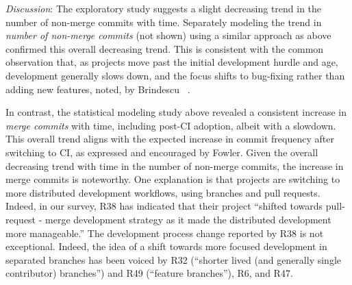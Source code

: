 %

%

\smallskip\noindent \emph{Discussion}:
The exploratory study suggests a slight decreasing trend in the number 
of non-merge commits with time.
Separately modeling the trend in \emph{number of non-merge commits}
(not shown) using a similar approach as above confirmed this overall 
decreasing trend.
This is consistent with the common observation that, as projects move 
past the initial development hurdle and age, development generally slows 
down, and the focus shifts to bug-fixing rather than adding new features, 
noted, \eg by Brindescu \etal~\cite{brindescu2014centralized}.

In contrast, the statistical modeling study above revealed a consistent 
increase in \emph{merge commits} with time, including post-CI adoption, 
albeit with a slowdown.
This overall trend aligns with the expected increase in commit frequency 
after switching to CI, as expressed and encouraged by Fowler.
Given the overall decreasing trend with time in the number of non-merge
commits, the increase in merge commits is noteworthy.
One explanation is that projects are switching to more distributed
development workflows, using branches and pull requests. 
Indeed, in our survey, R38 has indicated that their project ``shifted towards 
pull-request - merge development strategy as it made the distributed 
development more manageable.''
The development process change reported by R38 is not exceptional. 
Indeed, the idea of a shift towards more focused development in separated 
branches has been voiced by R32 (``shorter lived (and generally single contributor) 
branches'') and R49 (``feature branches''), R6, and R47.

